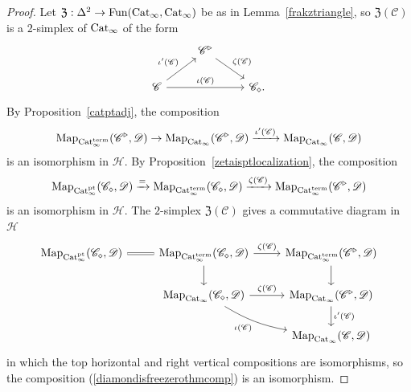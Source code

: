 \documentclass{tac}
\newcommand{\f}[1]{\mathfrak{#1}}
\newcommand{\s}[1]{\mathscr{#1}}
\newcommand{\tx}[1]{\textnormal{#1}}
\begin{document}
\begin{proof}
Let $\f{Z} : \Delta^2 \to \tx{Fun}(\tx{Cat}_\infty , \tx{Cat}_\infty)$ be as in Lemma~\ref{frakztriangle}, so $\f{Z} (\s{C})$ is a $2$-simplex of $\tx{Cat}_\infty$ of the form 
\[ \begin{tikzcd} &\s{C}^\triangleright \arrow[]{dr}{\zeta (\s{C})}& \\
\s{C}\arrow[]{ur}{\iota' (\s{C})} \arrow[]{rr}{\iota (\s{C})}&&\s{C}_\diamond .\end{tikzcd} \]
By Proposition~\ref{catptadj}, the composition 
\[ \tx{Map}_{\tx{Cat}_\infty^{\tx{term}}} (\s{C}^\triangleright , \s{D}) \to \tx{Map}_{\tx{Cat}_\infty} (\s{C}^\triangleright , \s{D}) \xrightarrow{\iota' (\s{C})} \tx{Map}_{\tx{Cat}_\infty} (\s{C} , \s{D}) \]
is an isomorphism in $\s{H}$.  By Proposition~\ref{zetaisptlocalization}, the composition
\[ \tx{Map}_{\tx{Cat}_\infty^\tx{pt}} (\s{C}_\diamond , \s{D}) \xrightarrow{=} \tx{Map}_{\tx{Cat}_\infty^\tx{term}} (\s{C}_\diamond , \s{D}) \xrightarrow{\zeta (\s{C})}  \tx{Map}_{\tx{Cat}_\infty^\tx{term}} (\s{C}^\triangleright , \s{D}) \]
is an isomorphism in $\s{H}$.  The $2$-simplex $\f{Z}(\s{C})$ gives a commutative diagram in $\s{H}$
\[\begin{tikzcd}
\tx{Map}_{ \tx{Cat}_\infty^{\tx{pt}}} (\s{C}_\diamond , \s{D}) \arrow[equal]{r} & \tx{Map}_{ \tx{Cat}_\infty^{\tx{term}}} (\s{C}_\diamond , \s{D}) \arrow[]{r}{\zeta (\s{C})} \arrow[]{d} & \tx{Map}_{ \tx{Cat}_\infty^{\tx{term}}} (\s{C}^\triangleright , \s{D})  \arrow[]{d} \\
& \tx{Map}_{ \tx{Cat}_\infty} (\s{C}_\diamond , \s{D})\arrow[]{r}{\zeta (\s{C})} \arrow[bend right=10]{dr}[swap]{\iota (\s{C})} & \tx{Map}_{ \tx{Cat}_\infty} (\s{C}^\triangleright , \s{D})  \arrow[]{d}{\iota' (\s{C})} \\
& &  \tx{Map}_{ \tx{Cat}_\infty} (\s{C} , \s{D})
\end{tikzcd}\]
in which the top horizontal and right vertical compositions are isomorphisms, so the composition (\ref{diamondisfreezerothmcomp}) is an isomorphism.
\end{proof}



\end{document}
